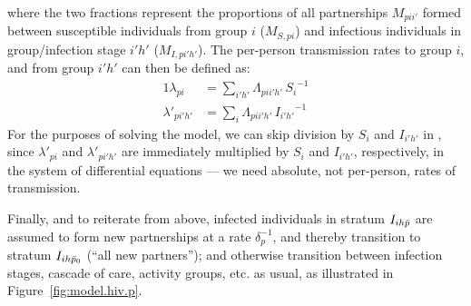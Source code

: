 where the two fractions represent the proportions of all partnerships $M_{pii'}$
formed between susceptible individuals from group $i$ ($M_{S,pi}$)
and infectious individuals in group/infection stage $i'h'$ ($M_{I,pi'h'}$).
The per-person transmission rates to group $i$, and from group $i'h'$ can then be defined as:
\begin{alignat}{1}
  \lambda_{pi} &= \sum_{i'h'} \Lambda_{pii'h'}\,{S_{i}}^{-1} \label{eq:foi.i} \\
  \lambda'_{pi'h'} &= \sum_{i} \Lambda_{pii'h'}\,{I_{i'h'}}^{-1} \label{eq:foi.jh}
\end{alignat}
For the purposes of solving the model,
we can skip division by $S_{i}$ and $I_{i'h'}$ in ,
since $\lambda'_{pi}$ and $\lambda'_{pi'h'}$ are immediately multiplied by $S_{i}$ and $I_{i'h'}$,
respectively, in the system of differential equations
--- \ie we need absolute, not per-person, rates of transmission.
\par
Finally, and to reiterate from above, infected individuals in stratum $I_{ih\bar{p}}$
are assumed to form new partnerships at a rate $\delta_p^{-1}$,
and thereby transition to stratum $I_{ih\bar{p}_0}$ (``all new partners''); and
otherwise transition between infection stages, cascade of care, activity groups, etc. as usual,
as illustrated in Figure~\ref{fig:model.hiv.p}.
